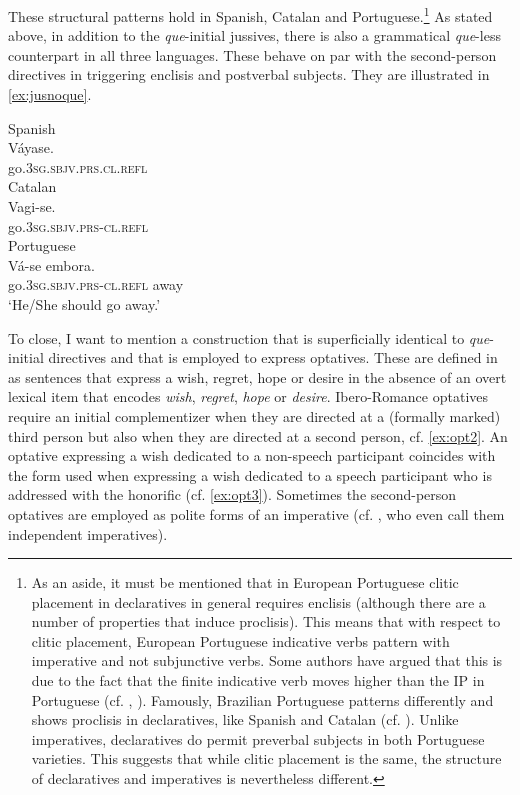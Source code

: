 These structural patterns hold in Spanish, Catalan and Portuguese.\footnote{As an aside, it must be mentioned that in  European Portuguese  clitic placement in declaratives in general requires enclisis (although there are a number of properties that induce proclisis). This means that  with respect to clitic placement, European Portuguese indicative verbs  pattern with imperative and not subjunctive verbs.  Some authors have argued that this is due to the fact that the finite indicative verb moves higher than the IP in Portuguese (cf. \citealt{Raposo2000}, \citealt{Galves2005}).  Famously, Brazilian Portuguese patterns differently and shows proclisis in declaratives, like Spanish and Catalan (cf. \citealt{Galves2005}).  Unlike imperatives, declaratives do permit preverbal subjects in both Portuguese varieties. This suggests that while clitic placement is the same, the structure of declaratives and imperatives is nevertheless different.
} As stated above, in addition to the \emph{que}-initial jussives, there is also a grammatical  \emph{que}-less counterpart in all three languages. These behave on  par with the second-person directives in triggering enclisis and postverbal subjects. They are illustrated in \eqref{ex:jusnoque}.

\ea\label{ex:jusnoque}
\ea\label{ex:jusnoquea}
 Spanish\\ 
\gll Váyase. \\
go.\textsc{3sg.sbjv.prs}.\textsc{cl.refl} \\	
\ex
Catalan\\ 
\gll Vagi-se. \\
go.\textsc{3sg.sbjv.prs}-\textsc{cl.refl} \\	
\ex
Portuguese\\ 
\gll Vá-se embora. \\
go.\textsc{3sg.sbjv.prs}-\textsc{cl.refl}  away\\
\glt`He/She should go away.' 
\z
\z


 To close, I want to mention a construction that is superficially identical to  \emph{que}-initial directives and that is employed to express optatives. These are defined in \citet{Grosz2012} as  sentences that express  a wish, regret, hope or desire in the absence of an overt lexical item
that encodes \emph{wish}, \emph{regret}, \emph{hope} or \emph{desire}.  Ibero-Romance optatives require an initial complementizer when they are directed at a (formally marked) third person  but also when they are directed  at a second person, cf. \eqref{ex:opt2}. An optative expressing a wish dedicated to  a non-speech participant coincides  with the form used when expressing a wish dedicated to a speech participant who is addressed with the honorific (cf. \ref{ex:opt3}). Sometimes the second-person optatives are employed as polite forms of an imperative (cf. \citealt{DemonteSoriano2014}, who even call them independent imperatives). 

